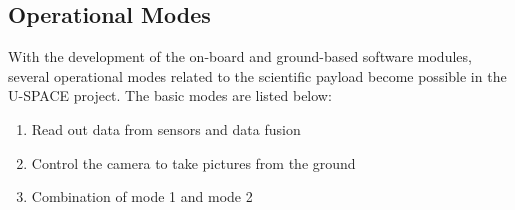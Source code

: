 \subsection{Operational Modes}

With the development of the on-board and ground-based software modules, several operational modes related to the scientific payload become possible in the \ac{U-SPACE} project. The basic modes are listed below:

\begin{enumerate}
\item Read out data from sensors and data fusion 
\item Control the camera to take pictures from the ground
\item Combination of mode 1 and mode 2
\end{enumerate}